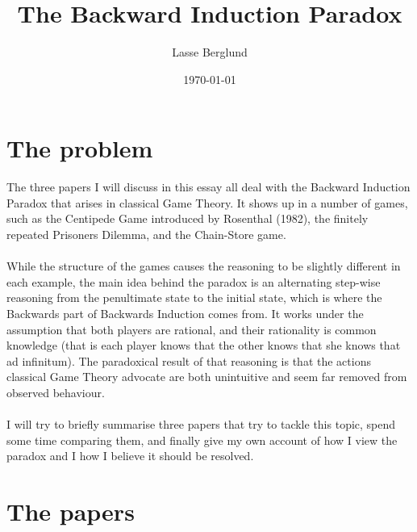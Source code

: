 \documentclass{article}
\title{The Backward Induction Paradox}
\author{Lasse Berglund}
\date{\today}
\begin{document}
\maketitle
\section{The problem}
The three papers I will discuss in this essay all deal with the Backward Induction Paradox that arises in classical Game Theory. It shows up in a number of games, such as the Centipede Game introduced by Rosenthal (1982), the finitely repeated Prisoners Dilemma, and the Chain-Store game.
\\
\\
While the structure of the games causes the reasoning to be slightly different in each example, the main idea behind the paradox is an alternating step-wise reasoning from the penultimate state to the initial state, which is where the Backwards part of Backwards Induction comes from. It works under the assumption that both players are rational, and their rationality is common knowledge (that is each player knows that the other knows that she knows that ad infinitum). The paradoxical result of that reasoning is that the actions classical Game Theory advocate are both unintuitive and seem far removed from observed behaviour.
\\
\\
I will try to briefly summarise three papers that try to tackle this topic, spend some time comparing them, and finally give my own account of how I view the paradox and I how I believe it should be resolved. 





















\section{The papers}
\end{document}
